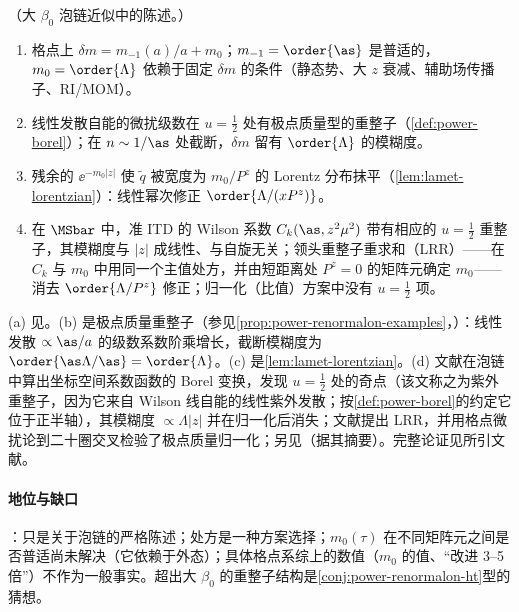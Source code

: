 \begin{proposition}\label{prop:lamet-lrr}
（大 $\beta_0$ 泡链近似中的陈述。）
\begin{enumerate}[label=(\alph*),leftmargin=2em,itemsep=1pt,topsep=2pt]
\item 格点上 $\delta m=m_{-1}(a)/a+m_0$；$m_{-1}=\order{\as}$ 是普适的，$m_0=\order{\Lambda}$ 依赖于固定 $\delta m$ 的条件（静态势、大 $z$ 衰减、辅助场传播子、RI/MOM）。
\item 线性发散自能的微扰级数在 $u=\frac12$ 处有极点质量型的重整子（\cref{def:power-borel}）；在 $n\sim1/\as$ 处截断，$\delta m$ 留有 $\order{\Lambda}$ 的模糊度。
\item 残余的 $\ee^{-m_0|z|}$ 使 $\tilde q$ 被宽度为 $m_0/P^z$ 的 Lorentz 分布抹平（\cref{lem:lamet-lorentzian}）：线性幂次修正 $\order{\Lambda/(xP^z)}$。
\item 在 $\MSbar$ 中，准 ITD 的 Wilson 系数 $C_k(\as,z^2\mu^2)$ 带有相应的 $u=\frac12$ 重整子，其模糊度与 $|z|$ 成线性、与自旋无关；领头重整子重求和（LRR）——在 $C_k$ 与 $m_0$ 中用同一个主值处方，并由短距离处 $P^z=0$ 的矩阵元确定 $m_0$——消去 $\order{\Lambda/P^z}$ 修正；归一化（比值）方案中没有 $u=\frac12$ 项。
\end{enumerate}
\end{proposition}

\begin{proofsketch}
(a) 见\cite{Ji:2020brr}。(b) 是极点质量重整子\cite{Beneke:1994sw,Bigi:1994em}（参见\cref{prop:power-renormalon-examples}，\tagP）：线性发散 $\propto\as/a$ 的级数系数阶乘增长，截断模糊度为 $\order{\as\Lambda/\as}=\order{\Lambda}$。(c) 是\cref{lem:lamet-lorentzian}。(d) 文献\cite{Braun:2018brg}在泡链中算出坐标空间系数函数的 Borel 变换，发现 $u=\frac12$ 处的奇点（该文称之为紫外重整子，因为它来自 Wilson 线自能的线性紫外发散；按\cref{def:power-borel}的约定它位于正半轴），其模糊度 $\propto\Lambda|z|$ 并在归一化后消失；文献\cite{Zhang:2023bxs}提出 LRR，并用格点微扰论到二十圈交叉检验了极点质量归一化；另见\cite{Holligan:2023rex}（据其摘要）。完整论证见所引文献。
\end{proofsketch}

\paragraph{地位与缺口}
\tagP：只是关于泡链的严格陈述；处方是一种方案选择；$m_0(\tau)$ 在不同矩阵元之间是否普适尚未解决（它依赖于外态\cite{Zhang:2023bxs}）；具体格点系综上的数值（$m_0$ 的值、“改进 3--5 倍”）不作为一般事实。超出大 $\beta_0$ 的重整子结构是\cref{conj:power-renormalon-ht}型的猜想。

